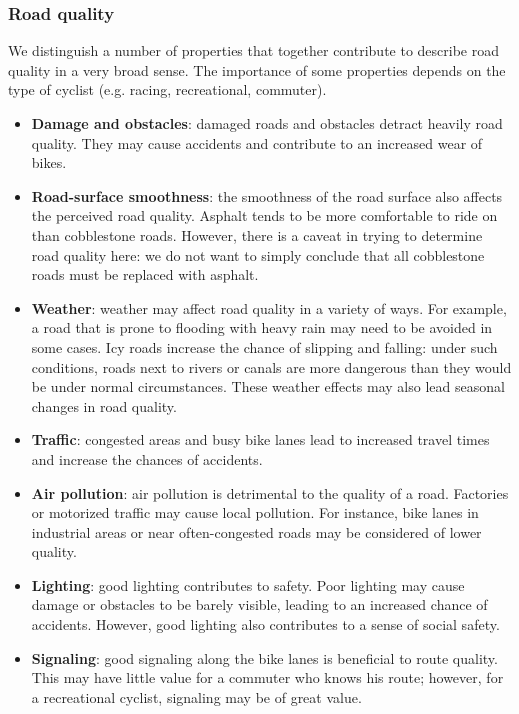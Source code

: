 \documentclass[a4paper,11pt]{article}
\begin{document}
\subsubsection{Road quality}
\label{sec:road-quality}
We distinguish a number of properties that together 
contribute to describe road quality in a very broad sense. 
The importance of some properties depends on the type of cyclist 
(e.g. racing, recreational, commuter).
\begin{itemize}\setlength{\itemsep}{-3pt}
\item \textbf{Damage and obstacles}: damaged roads and obstacles 
detract heavily road quality. 
They may cause accidents and contribute to an increased wear of bikes.
\item \textbf{Road-surface smoothness}: the smoothness of the road 
surface also affects the perceived road quality. 
Asphalt tends to be more comfortable to ride on than cobblestone roads. 
However, there is a caveat in trying to determine road quality here: 
we do not want to simply conclude that all cobblestone roads must be replaced with asphalt.
\item \textbf{Weather}: weather may affect road quality in a variety of ways. For example, 
a road that is prone to flooding with heavy rain may need to be avoided in some cases. 
Icy roads increase the chance of slipping and falling: under such conditions, 
roads next to rivers or canals are more dangerous than they would be under 
normal circumstances. These weather effects may also lead seasonal changes in road quality.
\item \textbf{Traffic}: congested areas and busy bike lanes lead to increased travel times 
and increase the chances of accidents.
\item \textbf{Air pollution}: air pollution is detrimental to the quality of a road. 
Factories or motorized traffic may cause local pollution. For instance, 
bike lanes in industrial areas or near often-congested roads may be considered of lower quality.
\item \textbf{Lighting}: good lighting contributes to safety. Poor lighting may cause damage or 
obstacles to be barely visible, leading to an increased chance of accidents. 
However, good lighting also contributes to a sense of social safety.
\item \textbf{Signaling}: good signaling along the bike lanes is beneficial to route quality. 
This may have little value for a commuter who knows his route; however, for a recreational cyclist, 
signaling may be of great value.
\end{itemize}
\end{document}
